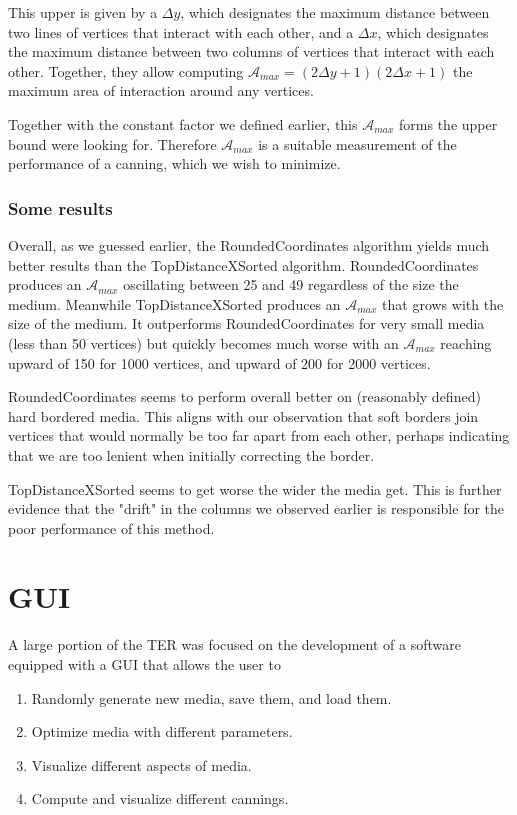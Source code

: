 \documentclass{article}
\begin{document}
This upper is given by a $\Delta y$, which designates the maximum distance between two lines of vertices that interact with each other, and a $\Delta x$, which designates the maximum distance between two columns of vertices that interact with each other. Together, they allow computing $\mathcal{A}_{max} = (2\Delta y + 1)(2\Delta x + 1)$ the maximum area of interaction around any vertices.

Together with the constant factor we defined earlier, this $\mathcal{A}_{max}$ forms the upper bound were looking for. Therefore $\mathcal{A}_{max}$ is a suitable measurement of the performance of a canning, which we wish to minimize.

\subsubsection{Some results}

Overall, as we guessed earlier, the RoundedCoordinates algorithm yields much better results than the TopDistanceXSorted algorithm. RoundedCoordinates produces an $\mathcal{A}_{max}$ oscillating between 25 and 49 regardless of the size the medium. Meanwhile TopDistanceXSorted produces an $\mathcal{A}_{max}$ that grows with the size of the medium. It outperforms RoundedCoordinates for very small media (less than 50 vertices) but quickly becomes much worse with an $\mathcal{A}_{max}$ reaching upward of 150 for 1000 vertices, and upward of 200 for 2000 vertices.

RoundedCoordinates seems to perform overall better on (reasonably defined) hard bordered media. This aligns with our observation that soft borders join vertices that would normally be too far apart from each other, perhaps indicating that we are too lenient when initially correcting the border.

TopDistanceXSorted seems to get worse the wider the media get. This is further evidence that the "drift" in the columns we observed earlier is responsible for the poor performance of this method.

\section{GUI}

A large portion of the TER was focused on the development of a software equipped with a GUI that allows the user to
\begin{enumerate}
	\item Randomly generate new media, save them, and load them.
	\item Optimize media with different parameters.
	\item Visualize different aspects of media.
	\item Compute and visualize different cannings.
\end{enumerate}
$ $
\end{document}
